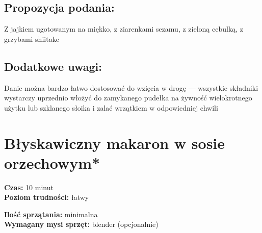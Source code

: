 \documentclass[a4paper,10pt]{book}
\begin{document}
\vspace{0.5cm}

\small \section*{Propozycja podania:} Z jajkiem ugotowanym na miękko, z ziarenkami sezamu, z zieloną cebulką, z grzybami shiitake

\vspace{0.3cm}

\section*{Dodatkowe uwagi:} Danie można bardzo łatwo dostosować do wzięcia w drogę — wszystkie składniki wystarczy uprzednio włożyć do zamykanego pudełka na żywność wielokrotnego użytku lub szklanego słoika i zalać wrzątkiem w odpowiedniej chwili

\chapter{Błyskawiczny makaron w sosie orzechowym*}

\vspace{0.1cm}
\small
\begin{minipage}{0.45\textwidth}
    \noindent \textbf{Czas:} 10 minut \\
    \textbf{Poziom trudności:} łatwy
\end{minipage}
\begin{minipage}{0.45\textwidth}
    \noindent \textbf{Ilość sprzątania:} minimalna\\
    \textbf{Wymagany mysi sprzęt:} blender (opcjonalnie)
\end{minipage}
\normalsize
\vspace{0.5cm}
\end{document}
